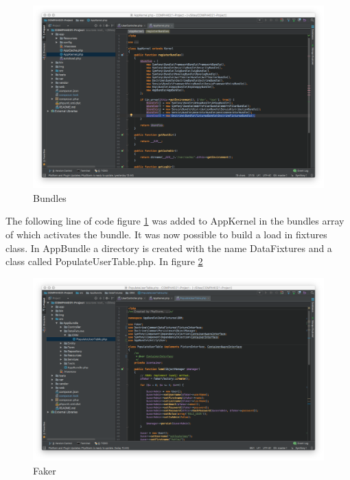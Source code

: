 \begin{figure}[htbp]
   \centering
   \includegraphics[width=400pt]{figures/bundles.png} %
   \caption{Bundles}
   \label{fig:Bundles}
\end{figure}

The following line of code figure \ref{fig:Bundles} was added to AppKernel in the bundles array of which activates the bundle. It was now possible to build a load in fixtures class. In AppBundle a directory is created with the name	 DataFixtures and a class called \newline PopulateUserTable.php. In figure \ref{fig:Faker}

\begin{figure}[htbp]
   \centering
   \includegraphics[width=400pt]{figures/faker.png} %
   \caption{Faker}
   \label{fig:Faker}
\end{figure}

